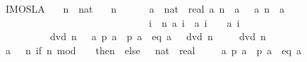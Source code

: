 \begin{isabellebody}
\endisatagproof
{\isafoldproof}%
%
\isadelimproof
\isanewline
%
\endisadelimproof
\isanewline
{}\isamarkupfalse%
\ IMO{}{}{}{}SL{\isacharunderscore}A{}{\isacharcolon}\isanewline
\ \ \ n\ {\isacharcolon}{\isacharcolon}\ nat\isanewline
\ \ \ {\isachardoublequoteopen}n\ {\isasymge}\ {}{\isachardoublequoteclose}\isanewline
\ \ \ {\isachardoublequoteopen}{\isacharparenleft}{\isasymexists}\ a\ {\isacharcolon}{\isacharcolon}\ nat\ {\isasymRightarrow}\ real{\isachardot}\ a\ n\ {\isacharequal}\ a\ {}\ {\isasymand}\ a\ {\isacharparenleft}n{\isacharplus}{}{\isacharparenright}\ {\isacharequal}\ a\ {}\ {\isasymand}\ \isanewline
\ \ \ \ \ \ \ \ \ \ \ \ \ \ \ \ \ \ \ \ \ \ \ \ \ \ \ \ \ {\isacharparenleft}{\isasymforall}\ i\ {\isacharless}\ n{\isachardot}\ {\isacharparenleft}a\ i{\isacharparenright}\ {\isacharasterisk}\ {\isacharparenleft}a\ {\isacharparenleft}i{\isacharplus}{}{\isacharparenright}{\isacharparenright}\ {\isacharplus}\ {}\ {\isacharequal}\ a\ {\isacharparenleft}i{\isacharplus}{}{\isacharparenright}{\isacharparenright}{\isacharparenright}\ {\isasymlongleftrightarrow}\ \isanewline
\ \ \ \ \ \ \ \ \ {}\ dvd\ n{\isachardoublequoteclose}\ {\isacharparenleft}\ {\isachardoublequoteopen}{\isacharparenleft}{\isasymexists}\ a{\isachardot}\ {\isacharquery}p{}\ a\ {\isasymand}\ {\isacharquery}p{}\ a\ {\isasymand}\ {\isacharquery}eq\ a{\isacharparenright}\ {\isasymlongleftrightarrow}\ {}\ dvd\ n{\isachardoublequoteclose}{\isacharparenright}\isanewline
%
\isadelimproof
%
\endisadelimproof
%
\isatagproof
{}\isamarkupfalse%
\isanewline
\ \ \isamarkupfalse%
\ {\isachardoublequoteopen}{}\ dvd\ n{\isachardoublequoteclose}\isanewline
\isanewline
\ \ \isamarkupfalse%
\ {\isacharquery}a\ {\isacharequal}\ {\isachardoublequoteopen}{\isacharparenleft}{\isasymlambda}\ n{\isachardot}\ if\ n\ mod\ {}\ {\isacharequal}\ {}\ then\ {}\ else\ {\isacharminus}{}{\isacharparenright}\ {\isacharcolon}{\isacharcolon}\ nat\ {\isasymRightarrow}\ real{\isachardoublequoteclose}\isanewline
\ \ \isamarkupfalse%
\ {\isachardoublequoteopen}{\isasymexists}\ a{\isachardot}\ {\isacharquery}p{}\ a\ {\isasymand}\ {\isacharquery}p{}\ a\ {\isasymand}\ {\isacharquery}eq\ a{\isachardoublequoteclose}\isanewline

\end{isabellebody}
